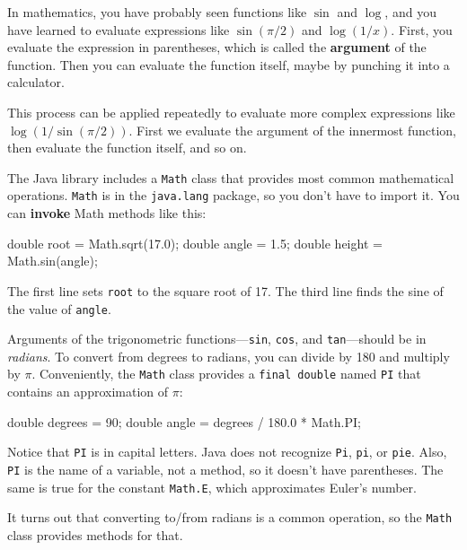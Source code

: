 \documentclass[12pt]{book}
\theoremstyle{exercise}
\newcommand{\java}[1]{\lstinline{#1}} %
\begin{document}

In mathematics, you have probably seen functions like $\sin$ and $\log$, and you have learned to evaluate expressions like $\sin(\pi/2)$ and $\log(1/x)$.
First, you evaluate the expression in parentheses, which is called the {\bf argument} of the function.
Then you can evaluate the function itself, maybe by punching it into a calculator.

This process can be applied repeatedly to evaluate more complex expressions like $\log(1/\sin(\pi/2))$.
First we evaluate the argument of the innermost function, then evaluate the function itself, and so on.


The Java library includes a \java{Math} class that provides most common mathematical operations.
\java{Math} is in the \java{java.lang} package, so you don't have to import it.
You can {\bf invoke} Math methods like this:

\begin{code}
    double root = Math.sqrt(17.0);
    double angle = 1.5;
    double height = Math.sin(angle);
\end{code}

The first line sets \java{root} to the square root of 17.
The third line finds the sine of the value of \java{angle}.


Arguments of the trigonometric functions---\java{sin}, \java{cos}, and \java{tan}---should be in {\em radians}.
To convert from degrees to radians, you can divide by 180 and multiply by $\pi$.
Conveniently, the \java{Math} class provides a \java{final double} named \java{PI} that contains an approximation of $\pi$:

\begin{code}
    double degrees = 90;
    double angle = degrees / 180.0 * Math.PI;
\end{code}

Notice that \java{PI} is in capital letters.
Java does not recognize \java{Pi}, \java{pi}, or \java{pie}.
Also, \java{PI} is the name of a variable, not a method, so it doesn't have parentheses.
The same is true for the constant \java{Math.E}, which approximates Euler's number.

It turns out that converting to/from radians is a common operation, so the \java{Math} class provides methods for that.
\end{document}
